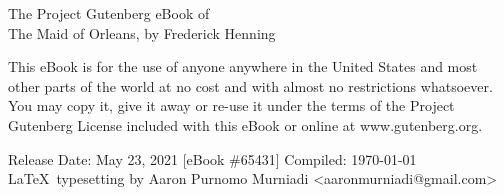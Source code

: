 \thispagestyle{empty}
{\small
\begin{center}
The Project Gutenberg eBook of\\The Maid of Orleans, by Frederick Henning
\end{center}
\vfill
This eBook is for the use of anyone anywhere in the United States and
most other parts of the world at no cost and with almost no restrictions
whatsoever. You may copy it, give it away or re-use it under the terms
of the Project Gutenberg License included with this eBook or online at
www.gutenberg.org.
\vfill
\begin{center}
Release Date: May 23, 2021 [eBook \#65431]
\vfill
\vfill
Compiled: \today
\vfill
\vfill
\vfill
\vfill
\LaTeX\ typesetting by Aaron Purnomo Murniadi
\vfill
<aaronmurniadi@gmail.com>
\vfill
\end{center}
}
